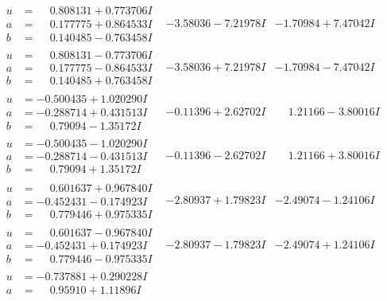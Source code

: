 \documentclass[1p]{elsarticle_modified}
\theoremstyle{definition}
\begin{document}
$$\begin{array}{c|c|c}
 \hline 
\begin{aligned}
u &= \phantom{-}0.808131 + 0.773706 I \\
a &= \phantom{-}0.177775 + 0.864533 I \\
b &= \phantom{-}0.140485 - 0.763458 I\end{aligned}
 & -3.58036 - 7.21978 I & -1.70984 + 7.47042 I \\ \hline\begin{aligned}
u &= \phantom{-}0.808131 - 0.773706 I \\
a &= \phantom{-}0.177775 - 0.864533 I \\
b &= \phantom{-}0.140485 + 0.763458 I\end{aligned}
 & -3.58036 + 7.21978 I & -1.70984 - 7.47042 I \\ \hline\begin{aligned}
u &= -0.500435 + 1.020290 I \\
a &= -0.288714 + 0.431513 I \\
b &= \phantom{-}0.79094 - 1.35172 I\end{aligned}
 & -0.11396 + 2.62702 I & \phantom{-}1.21166 - 3.80016 I \\ \hline\begin{aligned}
u &= -0.500435 - 1.020290 I \\
a &= -0.288714 - 0.431513 I \\
b &= \phantom{-}0.79094 + 1.35172 I\end{aligned}
 & -0.11396 - 2.62702 I & \phantom{-}1.21166 + 3.80016 I \\ \hline\begin{aligned}
u &= \phantom{-}0.601637 + 0.967840 I \\
a &= -0.452431 - 0.174923 I \\
b &= \phantom{-}0.779446 + 0.975335 I\end{aligned}
 & -2.80937 + 1.79823 I & -2.49074 - 1.24106 I \\ \hline\begin{aligned}
u &= \phantom{-}0.601637 - 0.967840 I \\
a &= -0.452431 + 0.174923 I \\
b &= \phantom{-}0.779446 - 0.975335 I\end{aligned}
 & -2.80937 - 1.79823 I & -2.49074 + 1.24106 I \\ \hline\begin{aligned}
u &= -0.737881 + 0.290228 I \\
a &= \phantom{-}0.95910 + 1.11896 I \\

\end{aligned}
\end{array}$$
\end{document}
